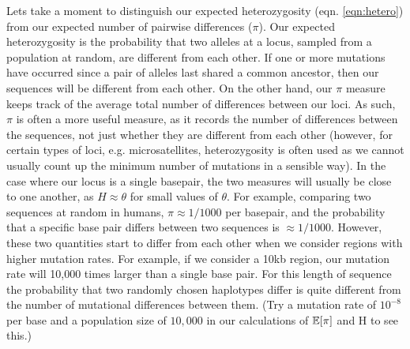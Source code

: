 Lets take a moment to distinguish our expected heterozygosity (eqn. \ref{eqn:hetero}) from our expected number of pairwise differences ($\pi$). Our expected heterozygosity is the probability that two alleles at a locus, sampled from a population at random, are different from each other. If one or more mutations have occurred since a pair of alleles last shared a common ancestor, then our sequences will be different from each other. On the other hand, our $\pi$ measure keeps track of the average total number of differences between our loci. As such, $\pi$ is often a more useful measure, as it records the number of differences between the sequences, not just whether they are different from each other (however, for certain types of loci, e.g. microsatellites, heterozygosity is often used as we cannot usually count up the minimum number of mutations in a sensible way). In the case where our locus is a single basepair, the two measures will usually be close to one another, as $H \approx \theta$ for small values of $\theta$. For example, comparing two sequences at random in humans, $\pi \approx 1/1000$ per basepair, and the probability that a specific base pair differs between two sequences is $\approx 1/1000$. However, these two quantities start to differ from each other when we consider regions with higher mutation rates. For example, if we consider a 10kb region, our mutation rate will 10,000 times larger than a single base pair. For this length of sequence the probability that two randomly chosen haplotypes differ is quite different from the number of mutational differences  between them. (Try a mutation rate of $10^{-8}$ per base and a population size of $10,000$ in our calculations of $\mathbb{E}[\pi]$ and H to see this.)


